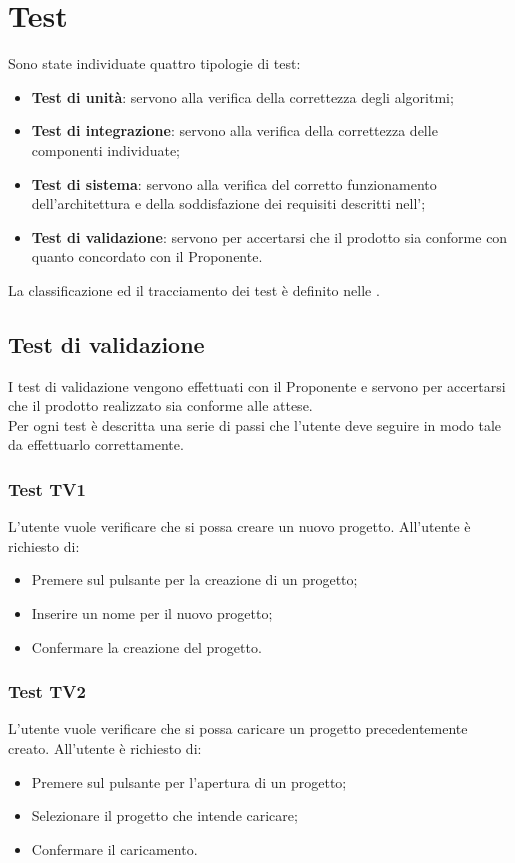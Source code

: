\documentclass[../PianoDiQualifica.tex]{subfiles}
\begin{document}
 
	\section{Test}\label{Test} 
		Sono state individuate quattro tipologie di test: 
		\begin{itemize} 
			\item \textbf{Test di unità}: servono alla verifica della correttezza degli algoritmi; 
			\item \textbf{Test di integrazione}: servono alla verifica della correttezza delle 
			componenti individuate; 
			\item \textbf{Test di sistema}: servono alla verifica del corretto funzionamento 
			dell'architettura e della soddisfazione dei requisiti descritti nell'\analisideirequisiti; 
			\item \textbf{Test di validazione}: servono per accertarsi che il prodotto sia conforme 
			con quanto concordato con il Proponente. 
		\end{itemize} 
		La classificazione ed il tracciamento dei test è definito nelle \normediprogettov. 
	\subsection{Test di validazione} 
		I test di validazione vengono effettuati con il Proponente e servono per accertarsi che
		il prodotto realizzato sia conforme alle attese.\\ 
		Per ogni test è descritta una serie di passi che l'utente deve seguire in modo tale da
		effettuarlo correttamente.  
	
	
	
	
	\subsubsection{Test TV1}  
	L'utente vuole verificare che si possa creare un nuovo progetto. 
	All'utente è richiesto di: 
	\begin{itemize} 
		\item Premere sul pulsante per la creazione di un progetto; 
		\item Inserire un nome per il nuovo progetto; 
		\item Confermare la creazione del progetto.
	\end{itemize} 
	
	\subsubsection{Test TV2} 
	L'utente vuole verificare che si possa caricare un progetto precedentemente creato. 
	All'utente è richiesto di: 
	\begin{itemize} 
		\item Premere sul pulsante per l'apertura di un progetto; 
		\item Selezionare il progetto che intende caricare; 
		\item Confermare il caricamento. 
	\end{itemize}     
	
\end{document}
